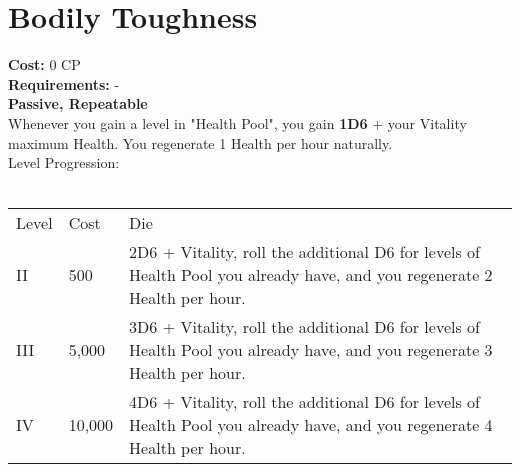 \section{Bodily Toughness}\label{sec:bodilythoughness}
\textbf{Cost:} 0 CP\\
\textbf{Requirements:} -\\
\textbf{Passive, Repeatable}\\
Whenever you gain a level in "Health Pool", you gain \textbf{1D6} + your Vitality maximum Health.
You regenerate 1 Health per hour naturally.
\\
Level Progression:\\
\\
\begin{tabular}{l | l | p{12cm} }
    Level & Cost & Die\\
    II & 500 & 2D6 + Vitality, roll the additional D6 for levels of Health Pool you already have, and you regenerate 2 Health per hour. \\
    III & 5,000 & 3D6 + Vitality, roll the additional D6 for levels of Health Pool you already have, and you regenerate 3 Health per hour. \\
    IV & 10,000 & 4D6 + Vitality, roll the additional D6 for levels of Health Pool you already have, and you regenerate 4 Health per hour.\\
\end{tabular}